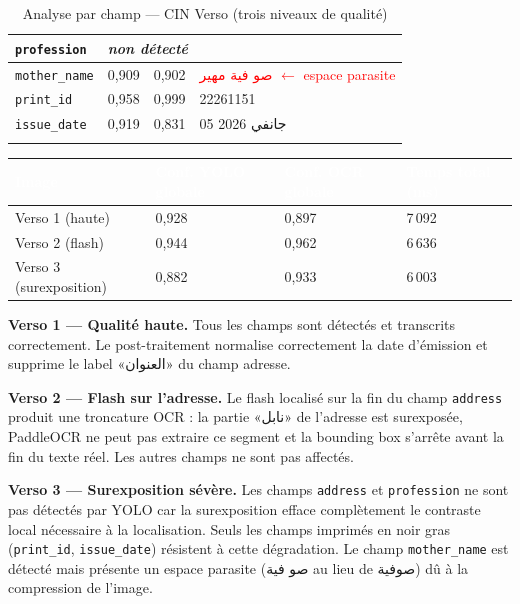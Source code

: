 \begin{longtable}{|p{3cm}|p{1.8cm}|p{1.8cm}|p{7.5cm}|}
  \texttt{profession}   & \multicolumn{3}{p{11.1cm}|}{\textit{non détecté}} \\ \hline
  \texttt{mother\_name} & 0,909 & 0,902 & \textcolor{red}{\textarabic{صو فية مهير}} \textcolor{red}{\small$\leftarrow$ espace parasite} \\ \hline
  \texttt{print\_id}    & 0,958 & 0,999 & 22261151 \\ \hline
  \texttt{issue\_date}  & 0,919 & 0,831 & \textarabic{05 جانفي 2026} \\ \hline
  \caption{Analyse par champ --- CIN Verso (trois niveaux de qualité)}
  \label{tab:analyse-verso}
\end{longtable}

\renewcommand{\arraystretch}{1.25}
\begin{center}
  \begin{tabular}{|p{4cm}|p{3.5cm}|p{3.5cm}|p{3cm}|}
    \hline
    \rowcolor{bleu_principal}
    \textcolor{white}{\textbf{Image}} & \textcolor{white}{\textbf{Conf. YOLO globale}} & \textcolor{white}{\textbf{Conf. OCR globale}} & \textcolor{white}{\textbf{Temps total (ms)}} \\
    \hline
    Verso 1 (haute)        & 0,928 & 0,897 & 7\,092 \\ \hline
    Verso 2 (flash)        & 0,944 & 0,962 & 6\,636 \\ \hline
    Verso 3 (surexposition)& 0,882 & 0,933 & 6\,003 \\ \hline
  \end{tabular}
  \label{tab:recap-verso}
\end{center}

\textbf{Verso 1 --- Qualité haute.} Tous les champs sont détectés et transcrits correctement. Le post-traitement normalise correctement la date d'émission et supprime le label «\textarabic{العنوان}» du champ adresse.

\textbf{Verso 2 --- Flash sur l'adresse.} Le flash localisé sur la fin du champ \texttt{address} produit une troncature OCR : la partie «\textarabic{نابل}» de l'adresse est surexposée, PaddleOCR ne peut pas extraire ce segment et la bounding box s'arrête avant la fin du texte réel. Les autres champs ne sont pas affectés.

\textbf{Verso 3 --- Surexposition sévère.} Les champs \texttt{address} et \texttt{profession} ne sont pas détectés par YOLO car la surexposition efface complètement le contraste local nécessaire à la localisation. Seuls les champs imprimés en noir gras (\texttt{print\_id}, \texttt{issue\_date}) résistent à cette dégradation. Le champ \texttt{mother\_name} est détecté mais présente un espace parasite (\textarabic{صو فية} au lieu de \textarabic{صوفية}) dû à la compression de l'image.

